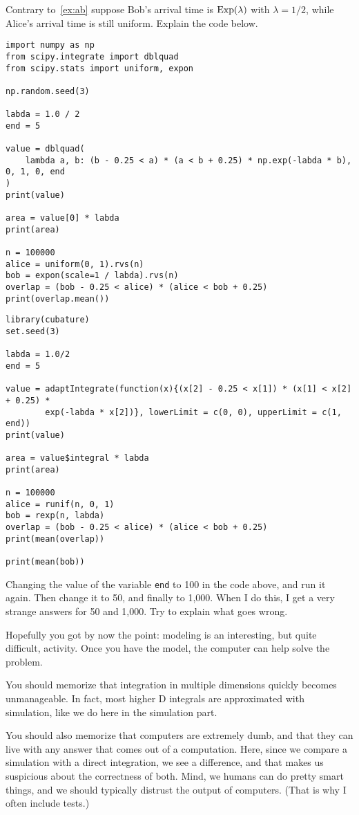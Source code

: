 \begin{exercise}
Contrary to~\cref{ex:ab} suppose Bob's arrival time is $\mathrm{Exp}(\lambda)$ with $\lambda=1/2$,  while Alice's arrival time is still uniform.
Explain the code below.
\begin{verbatim}
import numpy as np
from scipy.integrate import dblquad
from scipy.stats import uniform, expon

np.random.seed(3)

labda = 1.0 / 2
end = 5

value = dblquad(
    lambda a, b: (b - 0.25 < a) * (a < b + 0.25) * np.exp(-labda * b), 0, 1, 0, end
)
print(value)

area = value[0] * labda
print(area)

n = 100000
alice = uniform(0, 1).rvs(n)
bob = expon(scale=1 / labda).rvs(n)
overlap = (bob - 0.25 < alice) * (alice < bob + 0.25)
print(overlap.mean())
\end{verbatim}

\begin{verbatim}
library(cubature)   
set.seed(3)

labda = 1.0/2
end = 5

value = adaptIntegrate(function(x){(x[2] - 0.25 < x[1]) * (x[1] < x[2] + 0.25) *
		exp(-labda * x[2])}, lowerLimit = c(0, 0), upperLimit = c(1, end))
print(value)

area = value$integral * labda
print(area)

n = 100000
alice = runif(n, 0, 1)
bob = rexp(n, labda)
overlap = (bob - 0.25 < alice) * (alice < bob + 0.25)
print(mean(overlap))

print(mean(bob))
\end{verbatim}

\end{exercise}

\begin{exercise}
Changing the value of the variable \verb|end| to 100 in the code above, and run it again. Then change it to 50, and finally to 1,000.  When I do this, I get a very strange answers for 50 and 1,000. Try to explain what goes wrong.
\end{exercise}


Hopefully you got by now the point: modeling is an interesting, but  quite difficult, activity. Once you have the model, the computer can help solve the problem.


You should memorize that integration in multiple dimensions quickly becomes unmanageable. In fact, most higher D integrals are approximated with simulation, like we do here in the simulation part.

You should also memorize that computers are extremely dumb, and that they can live with any answer that comes out of a computation. Here, since we compare a simulation with a direct integration, we see a difference, and that makes us suspicious about the correctness of both. Mind, we humans can do pretty smart things, and we should typically distrust the output of computers. (That is why I often include tests.)
